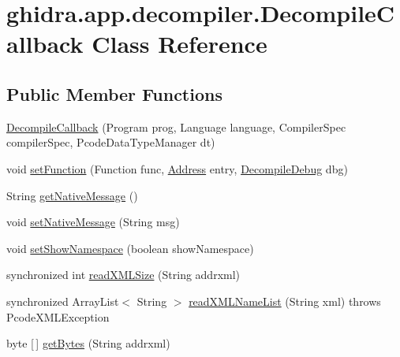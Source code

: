 \hypertarget{classghidra_1_1app_1_1decompiler_1_1_decompile_callback}{}\section{ghidra.\+app.\+decompiler.\+Decompile\+Callback Class Reference}
\label{classghidra_1_1app_1_1decompiler_1_1_decompile_callback}
\subsection*{Public Member Functions}
\begin{DoxyCompactItemize}
\item 
\mbox{\hyperlink{classghidra_1_1app_1_1decompiler_1_1_decompile_callback_a001664bd31c3a4cb8ec3fdaf1d770749}{Decompile\+Callback}} (Program prog, Language language, Compiler\+Spec compiler\+Spec, Pcode\+Data\+Type\+Manager dt)
\item 
void \mbox{\hyperlink{classghidra_1_1app_1_1decompiler_1_1_decompile_callback_ad1f1579f35c368cd5daa2a698e325d76}{set\+Function}} (Function func, \mbox{\hyperlink{class_address}{Address}} entry, \mbox{\hyperlink{classghidra_1_1app_1_1decompiler_1_1_decompile_debug}{Decompile\+Debug}} dbg)
\item 
String \mbox{\hyperlink{classghidra_1_1app_1_1decompiler_1_1_decompile_callback_a10df9c572093e669a18123a5acb361eb}{get\+Native\+Message}} ()
\item 
void \mbox{\hyperlink{classghidra_1_1app_1_1decompiler_1_1_decompile_callback_a231f5ee7ae38619c786870ec0bd45744}{set\+Native\+Message}} (String msg)
\item 
void \mbox{\hyperlink{classghidra_1_1app_1_1decompiler_1_1_decompile_callback_a821d08d61bdfaaf11784912f935f3cc1}{set\+Show\+Namespace}} (boolean show\+Namespace)
\item 
synchronized int \mbox{\hyperlink{classghidra_1_1app_1_1decompiler_1_1_decompile_callback_a55045ae9a88e963add118448051eab27}{read\+X\+M\+L\+Size}} (String addrxml)
\item 
synchronized Array\+List$<$ String $>$ \mbox{\hyperlink{classghidra_1_1app_1_1decompiler_1_1_decompile_callback_a418dbfbde7c2c37886f34a36fc6cfd74}{read\+X\+M\+L\+Name\+List}} (String xml)  throws Pcode\+X\+M\+L\+Exception 
\item 
byte \mbox{[}$\,$\mbox{]} \mbox{\hyperlink{classghidra_1_1app_1_1decompiler_1_1_decompile_callback_a28f31a524530fe44cec49ca2d1c91b08}{get\+Bytes}} (String addrxml)

\end{DoxyCompactItemize}
